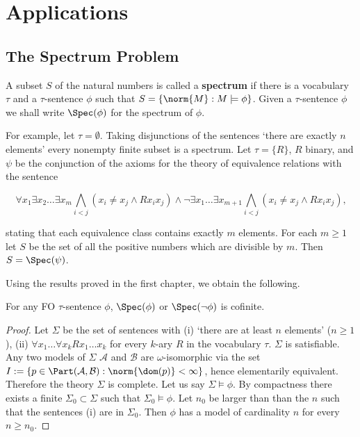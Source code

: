 \chapter[Applications]{Applications}

\section{The Spectrum Problem}
\begin{defn} A subset $S$ of the natural numbers is called a \textbf{spectrum} if there is a vocabulary $\tau$ and a $\tau$-sentence $\phi$ such that 
$S=\{ \norm{M} : M \models \phi\} $.
Given a $\tau$-sentence $\phi$ we shall write $\Spec(\phi)$ for the spectrum of $\phi$.
\end{defn}

For example, let $\tau=\emptyset$. Taking disjunctions of the sentences `there are exactly $n$ elements' every nonempty finite subset is a spectrum. 
Let $\tau=\{R\}$, $R$ binary, and $\psi$ be the conjunction of the axioms for the theory of equivalence relations with the sentence 

$$\forall x_1 \exists x_2 \ldots \exists x_m \bigwedge_{i < j } (x_i \neq x_j \land Rx_ix_j) \land \lnot \exists x_1 \ldots \exists x_{m+1} \bigwedge_{i < j } (x_i \neq x_j \land Rx_ix_j) \text{,}$$

stating that each equivalence class contains exactly $m$ elements. 
For each $m \ge 1$ let $S$ be the set of all the positive numbers which are divisible by $m$. 
Then $S= \Spec(\psi)$.  

Using the results proved in the first chapter, we obtain the following. 

\begin{thm} 
For any FO $\tau$-sentence $\phi$, $\Spec(\phi)$ or $\Spec(\lnot \phi)$ is cofinite. 
\begin{proof} 
Let $\Sigma$ be the set of sentences with (i) `there are at least $n$ elements' ($n \ge 1$), (ii) $\forall x_1 \ldots \forall x_k R x_1 \ldots x_k $ for every $k$-ary $R$ in the vocabulary $ \tau$. 
$\Sigma$ is satisfiable. 
Any two models of $\Sigma$ $\mathcal{A}$ and $\mathcal{B}$ are $\omega$-isomorphic via the set $I:=\{ p \in \Part(\mathcal{A}, \mathcal{B}): \norm{\dom(p)} < \infty  \}$, hence elementarily equivalent. 
Therefore the theory $\Sigma$ is complete.
Let us say $\Sigma \models \phi$. 
By compactness there exists a finite $\Sigma_0 \subset \Sigma$ such that $\Sigma_0 \models \phi$. 
Let $n_0$ be larger than than the $n$ such that the sentences (i) are in $\Sigma_0$.
Then $\phi$ has a model of cardinality $n$ for every $n \ge n_0$. 
\end{proof}
\end{thm}

